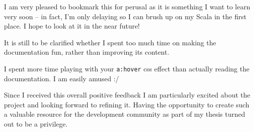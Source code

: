 \hrulefill

\begin{displayquote}

	I am very pleased to bookmark this for perusal as it is something I want to learn very soon -- in fact, I'm only delaying so I can brush up on my Scala in the first place. I hope to look at it in the near future!

\end{displayquote}

It is still to be clarified whether I spent too much time on making the documentation fun, rather than improving its content.

\begin{displayquote}

	I spent more time playing with your \texttt{a:hover} css effect than actually reading the documentation. I am easily amused :/

\end{displayquote}

Since I received this overall positive feedback I am particularly excited about the project and looking forward to refining it. Having the opportunity to create such a valuable resource for the development community as part of my thesis turned out to be a privilege.